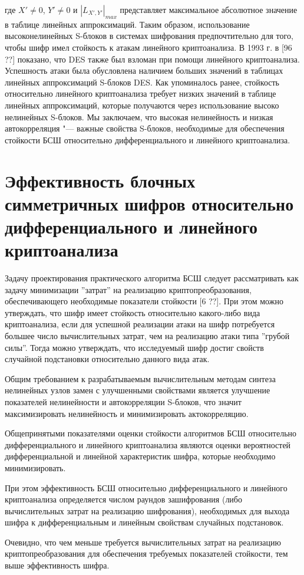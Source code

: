 где $X' \neq 0$, $Y' \neq 0$ и $|L_{X',Y'}|_{max}$ представляет максимальное
абсолютное значение в таблице линейных аппроксимаций. Таким образом,
использование высоконелинейных S-блоков в системах шифрования предпочтительно
для того, чтобы шифр имел стойкость к атакам линейного криптоанализа. В 1993 г.
в [96 ??] показано, что DES также был взломан при помощи линейного
криптоанализа. Успешность атаки была обусловлена наличием больших значений в
таблицах линейных аппроксимаций S-блоков DES. Как упоминалось ранее, стойкость
относительно линейного криптоанализа требует низких значений в таблице линейных
аппроксимаций, которые получаются через использование высоко нелинейных
S-блоков. Мы заключаем, что высокая нелинейность и низкая автокорреляция "---
важные свойства S-блоков, необходимые для обеспечения стойкости БСШ относительно
дифференциального и линейного криптоанализа.

\section{Эффективность блочных симметричных шифров относительно
дифференциального и линейного криптоанализа}

Задачу проектирования практического алгоритма БСШ следует рассматривать как
задачу минимизации ''затрат'' на реализацию криптопреобразования,
обеспечивающего необходимые показатели стойкости [6 ??]. При этом можно
утверждать, что шифр имеет стойкость относительно какого-либо вида
криптоанализа, если для успешной реализации атаки на шифр потребуется большее
число вычислительных затрат, чем на реализацию атаки типа ''грубой силы''.
Тогда можно утверждать, что исследуемый шифр достиг свойств случайной
подстановки относительно данного вида атак.

Общим требованием к разрабатываемым вычислительным методам синтеза нелинейных
узлов замен с улучшенными свойствами является улучшение показателей нелинейности
и автокорреляции S-блоков, что значит максимизировать нелинейность и
минимизировать актокорреляцию.

Общепринятыми показателями оценки стойкости алгоритмов БСШ относительно
дифференциального и линейного криптоанализа являются оценки вероятностей
дифференциальной и линейной характеристик шифра, которые необходимо
минимизировать.

При этом эффективность БСШ относительно дифференциального и линейного
криптоанализа определяется числом раундов зашифрования (либо вычислительных
затрат на реализацию шифрования), необходимых для выхода шифра к
дифференциальным и линейным свойствам случайных подстановок.

Очевидно, что чем меньше требуется вычислительных затрат на реализацию
криптопреобразования для обеспечения требуемых показателей стойкости, тем выше
эффективность шифра.
